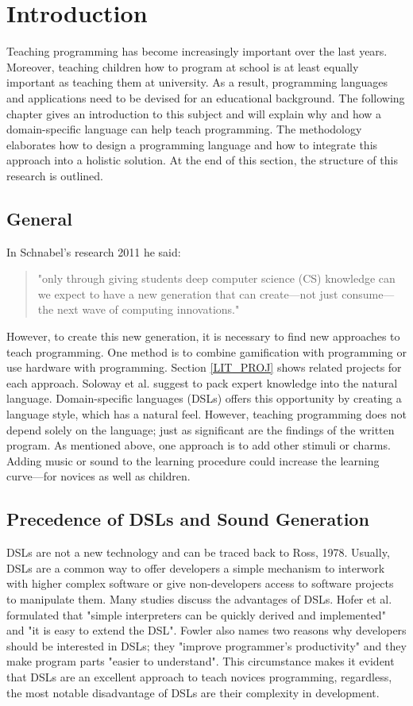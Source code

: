 \chapter{Introduction}
\label{INTRO}
Teaching programming has become increasingly important over the last years. Moreover, teaching children how to program at school is at least equally important as teaching them at university. As a result, programming languages and applications need to be devised for an educational background. The following chapter gives an introduction to this subject and will explain why and how a domain-specific language can help teach programming. The methodology elaborates how to design a programming language and how to integrate this approach into a holistic solution. At the end of this section, the structure of this research is outlined.

\section{General}
\label{INTRO_GEN}
In Schnabel's research 2011 he said:
\begin{quote}
"only through giving students deep computer science (CS) knowledge can we expect to have a new generation that can create—not just consume—the next wave of computing innovations."\cite{Schnabel2011}
\end{quote}
However, to create this new generation, it is necessary to find new approaches to teach programming. One method is to combine gamification with programming or use hardware with programming. Section \ref{LIT_PROJ} shows related projects for each approach. Soloway et al. suggest to pack expert knowledge into the natural language.\cite{Soloway1982} Domain-specific languages (DSLs) offers this opportunity by creating a language style, which has a natural feel. However, teaching programming does not depend solely on the language; just as significant are the findings of the written program.\cite{Kahn1995} As mentioned above, one approach is to add other stimuli or charms. Adding music or sound to the learning procedure could increase the learning curve—for novices as well as children.

\section{Precedence of DSLs and Sound Generation}
\label{INTRO_PRECE}
DSLs are not a new technology and can be traced back to Ross, 1978.\cite{Ross1978} Usually, DSLs are a common way to offer developers a simple mechanism to interwork with higher complex software or give non-developers access to software projects to manipulate them. Many studies discuss the advantages of DSLs. Hofer et al. formulated that "simple interpreters can be quickly derived and implemented" and "it is easy to extend the DSL".\cite{Hofer2011} Fowler also names two reasons why developers should be interested in DSLs; they "improve programmer’s productivity" and they make program parts "easier to understand".\cite[p. xxi]{Fowler2010} This circumstance makes it evident that DSLs are an excellent approach to teach novices programming, regardless, the most notable disadvantage of DSLs are their complexity in development.\cite{Mernik2005}

